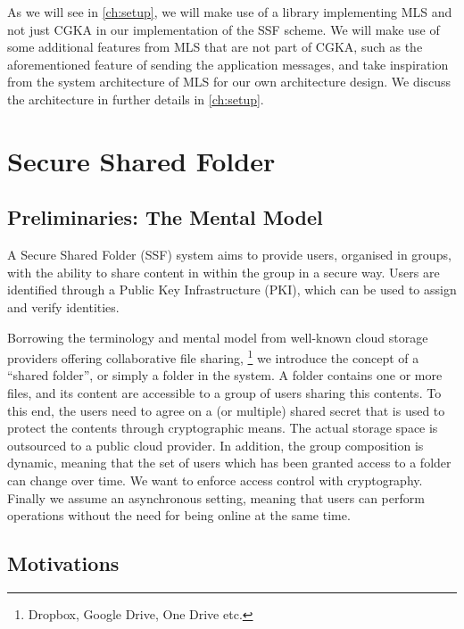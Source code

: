 As we will see in \cref{ch:setup}, we will make use of a library implementing MLS and not just CGKA in our implementation of the SSF scheme.
We will make use of some additional features from MLS that are not part of CGKA, such as the
aforementioned feature of sending the application messages,
and take inspiration from the system architecture of MLS for our own architecture design.
We discuss the architecture in further details in \cref{ch:setup}.


\section{Secure Shared Folder}\label{sc:SSF}

\subsection{Preliminaries: The Mental Model}\label{sc:mental-model}

A Secure Shared Folder (SSF) system aims to provide users, organised in groups, 
with the ability to share content in within the group in a secure way.
Users are identified through a Public Key Infrastructure (PKI),
which can be used to assign and verify identities.

Borrowing the terminology and mental model from well-known cloud storage providers offering collaborative file sharing, 
\footnote{Dropbox, Google Drive, One Drive etc.}
we introduce the concept of a ``shared folder'', or simply a folder in the system.
A folder contains one or more files, and its content are accessible to a group of users sharing this contents.
To this end, the users need to agree on a (or multiple) shared secret that is used to protect the contents through cryptographic means.
The actual storage space is outsourced to a public cloud provider.
In addition, the group composition is dynamic, meaning that the set of users which has been granted access to a folder can change over time.
We want to enforce access control with cryptography.
Finally we assume an asynchronous setting, meaning that users can
perform operations without the need for being online at the same time.

\subsection{Motivations}

